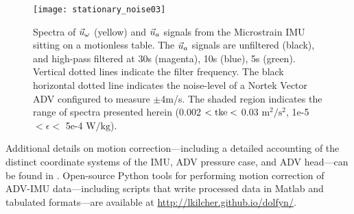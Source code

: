\begin{figure}
  \centering
  \label{fig:stationary_noise}
  \texttt{[image: stationary\_noise03]}
  \caption{Spectra of $\urot$ (yellow) and $\uacc$ signals from the Microstrain IMU sitting on a motionless table. The $\uacc$ signals are unfiltered (black), and high-pass filtered at 30s (magenta), 10s (blue), 5s (green). Vertical dotted lines indicate the filter frequency. The black horizontal dotted line indicates the noise-level of a Nortek Vector ADV configured to measure $\pm$4m/s. The shaded region indicates the range of spectra presented herein (0.002 $< \mathrm{tke} <$ 0.03 $\mathrm{m^2/s^2}$, 1e-5 $< \epsilon <$ 5e-4 $\mathrm{W/kg}$).}
\end{figure}

Additional details on motion correction---including a detailed accounting of the distinct coordinate systems of the IMU, ADV pressure case, and ADV head---can be found in \cite{Kilcher++2016}. Open-source Python tools for performing motion correction of ADV-IMU data---including scripts that write processed data in Matlab and tabulated formats---are available at \url{http://lkilcher.github.io/dolfyn/}.

\def\ue{\ensuremath{\vec{u}\earth}}

